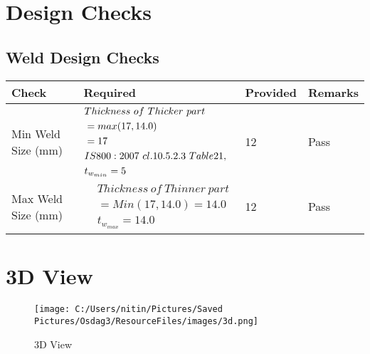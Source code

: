\documentclass{article}%
\begin{document}
%
%
\newpage%
\section{Design Checks}%
\label{sec:DesignChecks}%
\subsection{Weld Design Checks}%
\label{subsec:WeldDesignChecks}%
\renewcommand{\arraystretch}{1.2}%
\begin{longtable}{|p{4cm}|p{5cm}|p{5.5cm}|p{1.5cm}|}%
\hline%
\rowcolor{OsdagGreen}%
Check&Required&Provided&Remarks\\%
\hline%
\endhead%
\hline%
Min Weld Size (mm)&$\begin{aligned} &Thickness~of~Thicker~part\\ \noindent &=max(17,14.0)\\ &=17\\ &IS800:2007~cl.10.5.2.3~Table 21,\\  &t_{w_{min}}=5\end{aligned}$&12&Pass\\%
\hline%
Max Weld Size (mm)&$\begin{aligned} & Thickness~of~Thinner~part\\ &=Min(17,14.0)=14.0\\ &t_{w_{max}} =14.0\end{aligned}$&12&Pass\\%
\hline%
\end{longtable}

%
%
\newpage%
\section{3D View}%
\label{sec:3DView}%


\begin{figure}[h!]%
\centering%
\texttt{[image: C:/Users/nitin/Pictures/Saved Pictures/Osdag3/ResourceFiles/images/3d.png]}%
\caption{3D View}%
\end{figure}

%
\end{document}
